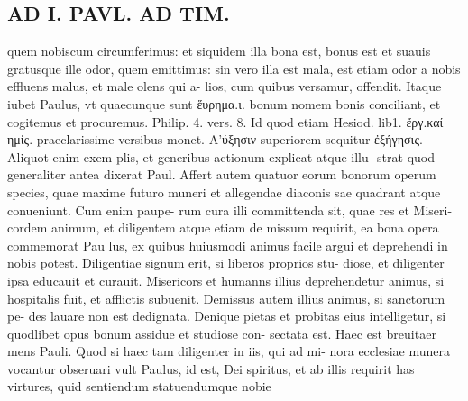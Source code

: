 \documentclass{article}
\begin{document}
\begin{pages}
\section*{AD I. PAVL. AD TIM. }
\marginpar{[ p.278 ]}\pstart quem nobiscum circumferimus: et siquidem illa bona est, bonus est et suauis gratusque ille odor, quem emittimus: sin vero illa est mala, est etiam odor a nobis effluens malus, et male olens qui a- lios, cum quibus versamur, offendit. Itaque iubet Paulus, vt quaecunque sunt ἕυρημα.ι. bonum nomem bonis conciliant, et cogitemus et procuremus. Philip. 4. vers. 8. Id quod etiam Hesiod. lib1. ἔργ.καί ημίς. praeclarissime versibus monet. Α’ύξησιν superiorem sequitur ἐξήγησις. Aliquot enim exem plis, et generibus actionum explicat atque illu- strat quod generaliter antea dixerat Paul. Affert autem quatuor eorum bonorum operum species, quae maxime futuro muneri et allegendae diaconis sae quadrant atque conueniunt. Cum enim paupe- rum cura illi committenda sit, quae res et Miseri- cordem animum, et diligentem atque etiam de missum requirit, ea bona opera commemorat Pau lus, ex quibus huiusmodi animus facile argui et deprehendi in nobis potest. Diligentiae signum erit, si liberos proprios stu- diose, et diligenter ipsa educauit et curauit.  Misericors et humanns illius deprehendetur animus, si hospitalis fuit, et afflictis subuenit. Demissus autem illius animus, si sanctorum pe- des lauare non est dedignata. Denique pietas et probitas eius intelligetur, si quodlibet opus bonum assidue et studiose con- sectata est. Haec est breuitaer mens Pauli. Quod si haec tam diligenter in iis, qui ad mi- nora ecclesiae munera vocantur obseruari vult Paulus, id est, Dei spiritus, et ab illis requirit has virtures, quid sentiendum statuendumque nobie  \pend

\end{pages}
\end{document}
